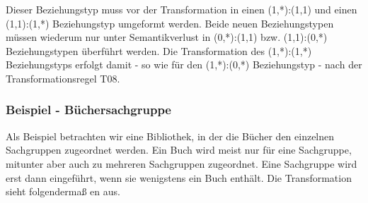         \begin{center}
        \end{center}
        Dieser Beziehungstyp muss vor der Transformation in einen (1,*):(1,1) und einen\\ (1,1):(1,*) Beziehungstyp umgeformt werden. Beide neuen Beziehungstypen m\"ussen wiederum nur unter Semantikverlust in (0,*):(1,1) bzw. (1,1):(0,*) Beziehungstypen \"uber\-f\"uhrt werden. Die Transformation des (1,*):(1,*) Beziehungstyps erfolgt damit - so wie f\"ur den (1,*):(0,*) Beziehungstyp - nach der Transformationsregel T08.
        \subsubsection{Beispiel - B\"uchersachgruppe}
          Als Beispiel betrachten wir eine Bibliothek, in der die B\"ucher den
          einzelnen Sachgruppen zugeordnet werden. Ein Buch wird meist nur f\"ur
          eine Sachgruppe, mitunter aber auch zu mehreren Sachgruppen
          zugeordnet. Eine Sachgruppe wird erst dann eingef\"uhrt, wenn sie
          wenigstens ein Buch enth\"alt. Die Transformation sieht folgenderma\ss
          en aus.

